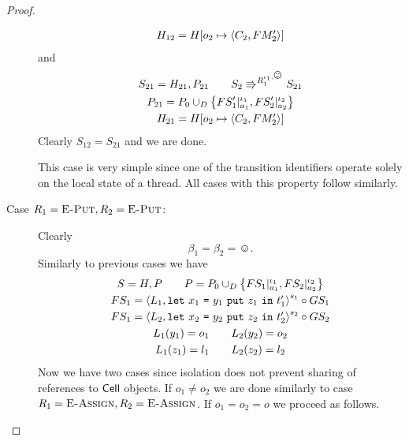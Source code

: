 \begin{proof}
\begin{description}
\begin{equation}
\begin{gathered}
          H_{12} = H[o_2 \mapsto \mbox{$\langle C_2, FM'_2 \rangle$}]
        \end{gathered}
      \end{equation}
      and 
      \begin{equation}
        \begin{gathered}
          S_{21} = H_{21}, P_{21} \andalso S_2 \Rrightarrow^{R_1^{\iota_1,
          \smiley}} S_{21}
          \\
          P_{21} = P_0 \cup_D \left\{ FS'_1|_{a_1}^{\iota_1},
          FS'_2|_{a_2}^{\iota_2} \right\} \\
          H_{21} = H[o_2 \mapsto \Obj{C_2, FM'_2}]
        \end{gathered}
      \end{equation}
      Clearly $S_{12} = S_{21}$ and we are done.
      \begin{remark}
        This case is very simple since one of the transition identifiers
        operate solely on the local state of a thread. All cases with this
        property follow similarly.
      \end{remark}
    \item[Case $R_1 = \mbox{{\sc E-Put}}, R_2 = \mbox{{\sc E-Put}}$:] Clearly
      \begin{equation*}
        \beta_1 = \beta_2 = \smiley.
      \end{equation*}
      Similarly to previous cases we have
      \begin{equation}
        \begin{gathered}
          S = H, P \quad\quad P = P_0 \cup_D \left\{ FS_1|_{a_1}^{\iota_1},
          FS_2|_{a_2}^{\iota_2} \right\} \\
          FS_1 = \mbox{$\langle L_1, \mbox{\mdseries\texttt{let}~$x_1$~\texttt{=}~$\mbox{\mdseries$y_1$~\texttt{put}~$z_1$}$~\texttt{in}~$t'_1$} \rangle$}^{s_1} \circ GS_1
          \\ 
          FS_1 = \mbox{$\langle L_2, \mbox{\mdseries\texttt{let}~$x_2$~\texttt{=}~$\mbox{\mdseries$y_2$~\texttt{put}~$z_2$}$~\texttt{in}~$t'_2$} \rangle$}^{s_2}
          \circ GS_2 \\
          L_1(y_1) = o_1 \quad\quad L_2(y_2) = o_2 \\
          L_1(z_1) = l_1 \quad\quad L_2(z_2) = l_2
        \end{gathered}
      \end{equation}
      Now we have two cases since isolation does not prevent sharing of
      references to $\mbox{$\mathsf{Cell}$}$ objects. If $o_1 \neq o_2$ we are done similarly
      to case $R_1 = \mbox{{\sc E-Assign}}, R_2 = \mbox{{\sc E-Assign}}$. If $o_1 = o_2 = o$ we proceed as
      follows.
      

\end{description}
\end{proof}
